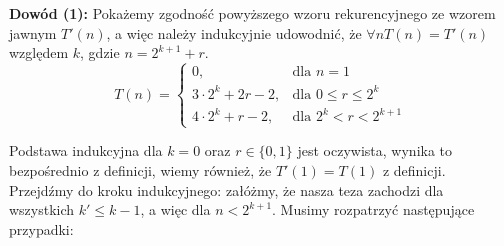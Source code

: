 \documentclass[a4paper,12pt]{article}
\begin{document}
\noindent \textbf{Dowód (1):} Pokażemy zgodność powyższego wzoru rekurencyjnego ze wzorem jawnym $T'(n)$, a więc należy indukcyjnie udowodnić, że $\forall n T(n) = T'(n)$ względem $k$, gdzie $n = 2^{k+1} + r$.
$$
T(n) = 
\begin{cases}
0, 			& \text{dla } n=1\\
3\cdot 2^k + 2r-2, 	& \text{dla } 0 \leq r \leq 2^k\\
4\cdot 2^k + r - 2, 	& \text{dla } 2^k < r < 2^{k+1} 
\end{cases}
$$

\noindent Podstawa indukcyjna dla $k = 0$ oraz $r \in \{ 0, 1 \}$ jest oczywista, wynika to bezpośrednio z definicji, wiemy również, że $T'(1) = T(1)$ z definicji. Przejdźmy do kroku indukcyjnego: załóżmy, że nasza teza zachodzi dla wszystkich $k' \leq k-1$, a więc dla $n < 2^{k+1}$. Musimy rozpatrzyć następujące przypadki:
\end{document}
